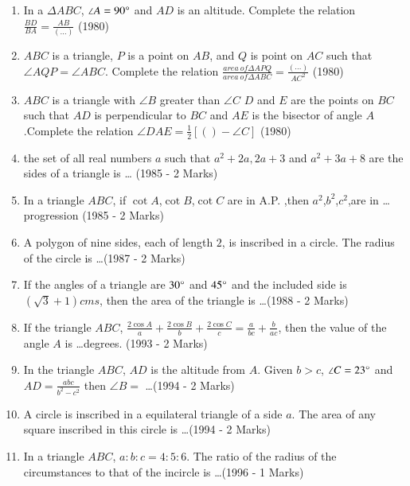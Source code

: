 
\begin{enumerate}[label=\thesubsection.\arabic*,ref=\thesubsection.\theenumi]
    \item In a $\Delta ABC$, $\angle A=90\degree$ and $AD$ is an altitude. Complete the relation\\
    $\frac{BD}{BA} = \frac{AB}{(\dots)}$
    \hfill (1980)
    
    \item $ABC$ is a triangle, $P$ is a point on $AB$, and $Q$ is point on $AC$ such that $\angle AQP = \angle ABC$. Complete the relation
    $\frac{area\ of \Delta APQ}{area\ of \Delta ABC} =\frac{(\dots)}{AC^2}$
    \hfill (1980)
    
    \item $ABC$ is a triangle with $\angle B $ greater than $\angle C$ 
    $D$ and $E$ are the points on $BC$ such that $AD$ is perpendicular to $BC$ and $AE$ is the bisector of angle $A$ .Complete the relation
    $\angle DAE = \frac{1}{2} [( ) - \angle C]$
    \hfill (1980)
    \item the set of all real numbers $a$ such that $a^2 + 2a, 2a + 3$ and $a^2 + 3a + 8$ are the sides of a triangle is \dots
    \hfill (1985 - 2 Marks)
    \item In a triangle $ABC$, if $\cot A$,$\cot B$,$\cot C$ are in A.P. ,then $a^2$,$b^2$,$c^2$,are in \dots progression \hfill (1985 - 2 Marks)
    \item A polygon of nine sides, each of length $2$, is inscribed in a circle. The radius of the circle is \dots \hfill (1987 - 2 Marks) 
    \item If the angles of a triangle are $30\degree$ and $45\degree$ and the included side is $(\sqrt{3} + 1) cms$, then the area of the triangle is \dots \hfill (1988 - 2 Marks)
    \item If the triangle $ABC$, $\frac{2\cos A}{a} + \frac{2\cos B}{b} + \frac{2\cos C}{c} = \frac{a}{bc} +  \frac{b}{ac}$, then the value of the angle $A$ is \dots degrees. \hfil (1993 - 2 Marks)
    \item In the triangle $ABC$, $AD$ is the altitude from $A$. Given $b>c$, $\angle C=23 \degree$ and $AD = \frac{abc}{b^2 - c^2}$ then $\angle B = $ \dots \hfill (1994 - 2 Marks)
    \item A circle is inscribed in a equilateral triangle of a side $a$. The area of any square inscribed in this circle is \dots \hfill (1994 - 2 Marks)  
    \item In a triangle $ABC$, $a:b:c = 4:5:6$. The ratio of the radius of the circumstances to that of the incircle is \dots \hfill (1996 - 1 Marks) 

\end{enumerate}
